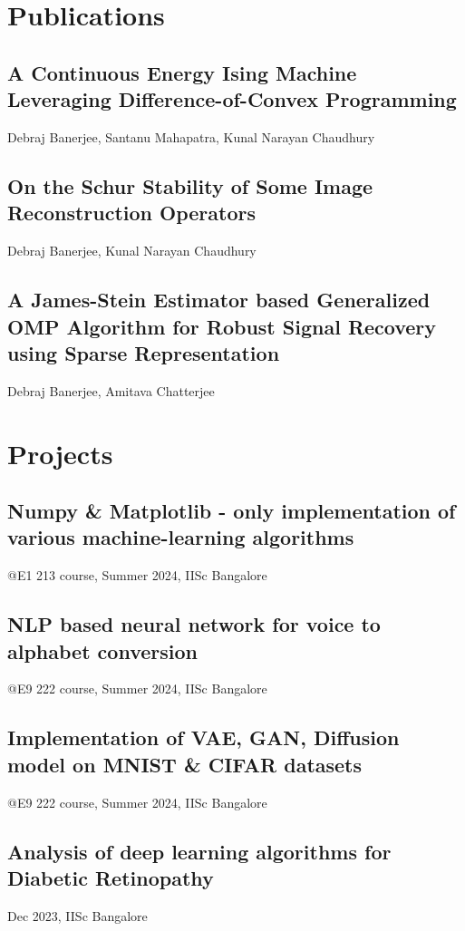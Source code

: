 \documentclass[a4paper,10pt]{article}
\begin{document}
\section*{Publications}
\subsection*{A Continuous Energy Ising Machine Leveraging Difference-of-Convex Programming \href{https://arxiv.org/abs/2509.01928}{\faGraduationCap}} 
Debraj Banerjee, Santanu Mahapatra, Kunal Narayan Chaudhury 

\subsection*{On the Schur Stability of Some Image Reconstruction Operators \href{https://arxiv.org/abs/2509.06715}{\faGraduationCap}} 
Debraj Banerjee, Kunal Narayan Chaudhury 

\subsection*{A James-Stein Estimator based Generalized OMP Algorithm for Robust Signal Recovery using Sparse Representation \href{https://arxiv.org/abs/2509.01410}{\faGraduationCap}} 
Debraj Banerjee, Amitava Chatterjee


\section*{Projects}
\subsection*{Numpy \& Matplotlib - only implementation of various machine-learning algorithms} @E1 213 course, Summer 2024, IISc Bangalore

\subsection*{NLP based neural network for voice to alphabet conversion} @E9 222 course, Summer 2024, IISc Bangalore

\subsection*{Implementation of VAE, GAN, Diffusion model on MNIST \& CIFAR datasets} @E9 222 course, Summer 2024, IISc Bangalore

\subsection*{Analysis of deep learning algorithms for Diabetic Retinopathy}
Dec 2023, IISc Bangalore 
\href{https://www.slideshare.net/slideshows/analysisofdeeplearningalgorithmsfordiabeticretinopathypptx/266808368}{\faSlideshare}
\end{document}
